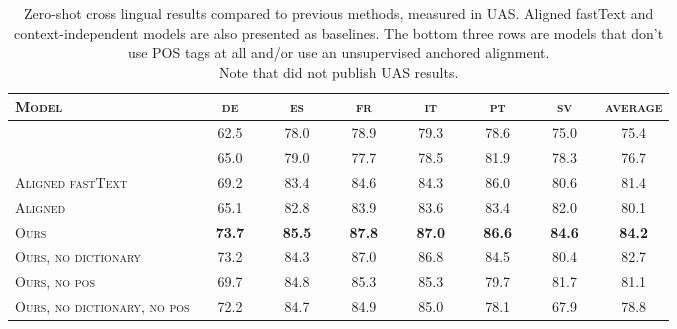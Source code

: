 \documentclass[11pt,a4paper]{article}
\begin{document}
\begin{table*}[h!]\label{table:additional_zero}
\begin{tabular}{l|cccccc|c}
\toprule
\textsc{Model}              & \textsc{de}        & \textsc{es}        & \textsc{fr}        & \textsc{it}        & \textsc{pt}        & \textsc{sv}        & \textsc{average}       \\ \midrule
\citet{zhang_hierarchical_2015}           & 62.5     & 78.0     & 78.9     & 79.3     & 78.6     & 75.0     & 75.4     \\ \citet{guo_representation_2016}                & 65.0     & 79.0     & 77.7     & 78.5     & 81.9     & 78.3     & 76.7     \\ \midrule 
\textsc{Aligned fastText} & \ \ 69.2\ \  & \ \ 83.4\ \   & \ \ 84.6\ \  & \ \ 84.3\ \  & \ \ 86.0\ \  & \ \ 80.6\ \  & \ \ 81.4\ \  \\ \textsc{Aligned}        & 65.1 & 82.8 & 83.9 & 83.6 & 83.4 & 82.0 & 80.1 \\ \textsc{Ours}               & \textbf{73.7} & \textbf{85.5} & \textbf{87.8} & \textbf{87.0} & \textbf{86.6} & \textbf{84.6} & \textbf{84.2} \\ \midrule \midrule
\textsc{Ours, no dictionary}    & 73.2 & 84.3 & 87.0 & 86.8 & 84.5 & 80.4 & 82.7 \\ \textsc{Ours, no pos} &   69.7 & 84.8  & 85.3 & 85.3 & 79.7 &  81.7 & 81.1 \\ \textsc{Ours, no dictionary, no pos} & 72.2  &	84.7  &	84.9  &	85.0  &	78.1  &	67.9 & 78.8\\ \bottomrule
\end{tabular}
\caption{Zero-shot cross lingual results compared to previous methods, measured in UAS. Aligned fastText and  context-independent models are also presented as baselines. The bottom three rows are models that don't use POS tags at all and/or use an unsupervised anchored alignment. \\
Note that \citet{ammar_one_2016} did not publish UAS results.}\label{table:appendix_zeroshot}
\end{table*} 
\end{document}
